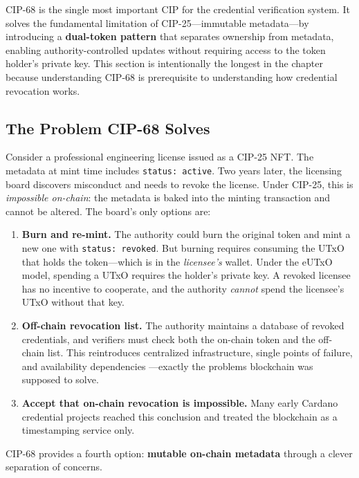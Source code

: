 CIP-68 is the single most important CIP for the credential verification
system.  It solves the fundamental limitation of CIP-25---immutable
metadata---by introducing a \textbf{dual-token pattern} that separates
ownership from metadata, enabling authority-controlled updates without
requiring access to the token holder's private key.  This section is
intentionally the longest in the chapter because understanding CIP-68 is
prerequisite to understanding how credential revocation works.

\subsection{The Problem CIP-68 Solves}

Consider a professional engineering license issued as a CIP-25 NFT.  The
metadata at mint time includes \texttt{status: active}.  Two years later, the
licensing board discovers misconduct and needs to revoke the license.  Under
CIP-25, this is \emph{impossible on-chain}: the metadata is baked into the
minting transaction and cannot be altered.  The board's only options are:

\begin{enumerate}[nosep]
  \item \textbf{Burn and re-mint.}  The authority could burn the original
    token and mint a new one with \texttt{status: revoked}.  But burning
    requires consuming the UTxO that holds the token---which is in the
    \emph{licensee's} wallet.  Under the eUTxO model, spending a UTxO
    requires the holder's private key.  A revoked licensee has no incentive
    to cooperate, and the authority \emph{cannot} spend the licensee's UTxO
    without that key.
  \item \textbf{Off-chain revocation list.}  The authority maintains a
    database of revoked credentials, and verifiers must check both the
    on-chain token and the off-chain list.  This reintroduces centralized
    infrastructure, single points of failure, and availability dependencies
    ---exactly the problems blockchain was supposed to solve.
  \item \textbf{Accept that on-chain revocation is impossible.}  Many
    early Cardano credential projects reached this conclusion and treated
    the blockchain as a timestamping service only.
\end{enumerate}

CIP-68 provides a fourth option: \textbf{mutable on-chain metadata} through
a clever separation of concerns.

